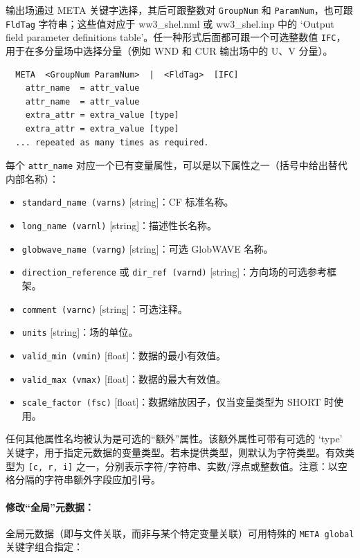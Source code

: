 \noindent
输出场通过 META 关键字选择，其后可跟整数对 \texttt{GroupNum} 和 \texttt{ParamNum}，也可跟 \texttt{FldTag} 字符串；这些值对应于 ww3\_shel.nml 或 ww3\_shel.inp 中的 `Output field parameter definitions table'。任一种形式后面都可跟一个可选整数值 \texttt{IFC}，用于在多分量场中选择分量（例如 WND 和 CUR 输出场中的 U、V 分量）。

\begin{verbatim}
  META  <GroupNum ParamNum>  |  <FldTag>  [IFC]
    attr_name  = attr_value
    attr_name  = attr_value
    extra_attr = extra_value [type]
    extra_attr = extra_value [type]
  ... repeated as many times as required.
\end{verbatim}


\noindent
每个 \texttt{attr\_name} 对应一个已有变量属性，可以是以下属性之一（括号中给出替代内部名称）：
\begin{itemize}
 \item  \texttt{standard\_name (varns)} [string]：CF 标准名称。
 \item  \texttt{long\_name (varnl)} [string]：描述性长名称。
 \item  \texttt{globwave\_name (varng)} [string]：可选 GlobWAVE 名称。
 \item  \texttt{direction\_reference} 或 \texttt{dir\_ref (varnd)} [string]：方向场的可选参考框架。
 \item  \texttt{comment (varnc)} [string]：可选注释。
 \item  \texttt{units} [string]：场的单位。
 \item  \texttt{valid\_min (vmin)} [float]：数据的最小有效值。
 \item  \texttt{valid\_max (vmax)} [float]：数据的最大有效值。
 \item  \texttt{scale\_factor (fsc)} [float]：数据缩放因子，仅当变量类型为 SHORT 时使用。
\end{itemize}

\noindent
任何其他属性名均被认为是可选的“额外”属性。该额外属性可带有可选的 `type' 关键字，用于指定元数据的变量类型。若未提供类型，则默认为字符类型。有效类型为 \texttt{[c, r, i]} 之一，分别表示字符/字符串、实数/浮点或整数值。注意：以空格分隔的字符串额外字段应加引号。

\noindent
\paragraph{修改“全局”元数据：}

\noindent
全局元数据（即与文件关联，而非与某个特定变量关联）可用特殊的 \texttt{META global} 关键字组合指定：

